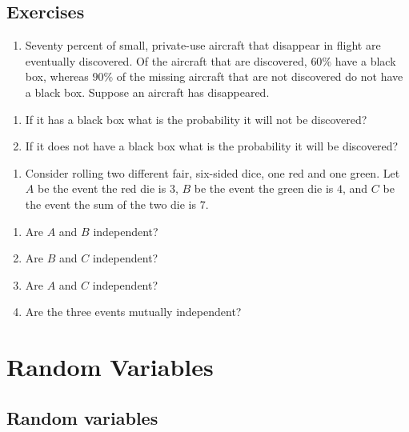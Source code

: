 \documentclass[]{book}
\providecommand{\tightlist}{%
  \setlength{\itemsep}{0pt}\setlength{\parskip}{0pt}}
\begin{document}
\section{Exercises}\label{exercises-2}

\begin{enumerate}
\def\labelenumi{\arabic{enumi}.}
\tightlist
\item
  Seventy percent of small, private-use aircraft that disappear in
  flight are eventually discovered. Of the aircraft that are discovered,
  \(60\%\) have a black box, whereas \(90\%\) of the missing aircraft
  that are not discovered do not have a black box. Suppose an aircraft
  has disappeared.
\end{enumerate}

\begin{enumerate}
\def\labelenumi{\alph{enumi}.}
\tightlist
\item
  If it has a black box what is the probability it will not be
  discovered?
\item
  If it does not have a black box what is the probability it will be
  discovered?
\end{enumerate}

\begin{enumerate}
\def\labelenumi{\arabic{enumi}.}
\setcounter{enumi}{1}
\tightlist
\item
  Consider rolling two different fair, six-sided dice, one red and one
  green. Let \(A\) be the event the red die is 3, \(B\) be the event the
  green die is \(4\), and \(C\) be the event the sum of the two die is
  \(7\).
\end{enumerate}

\begin{enumerate}
\def\labelenumi{\alph{enumi}.}
\tightlist
\item
  Are \(A\) and \(B\) independent?
\item
  Are \(B\) and \(C\) independent?
\item
  Are \(A\) and \(C\) independent?
\item
  Are the three events mutually independent?
\end{enumerate}

\chapter{Random Variables}\label{random-variables}

\section{Random variables}\label{random-variables-1}
\end{document}
